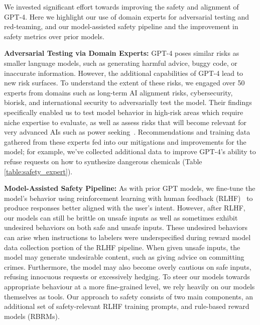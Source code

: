 We invested significant effort towards improving the safety and alignment of GPT-4. Here we highlight our use of domain experts for adversarial testing and red-teaming, and our model-assisted safety pipeline \citep{openaialignmentblog} and the improvement in safety metrics over prior models. 

\textbf{Adversarial Testing via Domain Experts:} GPT-4 poses similar risks as smaller language models, such as generating harmful advice, buggy code, or inaccurate information. However, the additional capabilities of GPT-4 lead to new risk surfaces. To understand the extent of these risks, we engaged over 50 experts from domains such as long-term AI alignment risks, cybersecurity, biorisk, and international security to adversarially test the model. Their findings specifically enabled us to test model behavior in high-risk areas which require niche expertise to evaluate, as well as assess risks that will become relevant for very advanced AIs such as power seeking~\citep{Carlsmith2022IsPA}. Recommendations and training data gathered from these experts fed into our mitigations and improvements for the model; for example, we've collected additional data to improve GPT-4's ability to refuse requests on how to synthesize dangerous chemicals (Table \ref{table:safety_expert}).

\textbf{Model-Assisted Safety Pipeline:} As with prior GPT models, we fine-tune the model's behavior using reinforcement learning with human feedback (RLHF)~\citep{christiano2017deep, ouyang2022training} to produce responses better aligned with the user's intent. However, after RLHF, our models can still be brittle on unsafe inputs as well as sometimes exhibit undesired behaviors on both safe and unsafe inputs. These undesired behaviors can arise when instructions to labelers were underspecified during reward model data collection portion of the RLHF pipeline. When given unsafe inputs, the model may generate undesirable content, such as giving advice on committing crimes. Furthermore, the model may also become overly cautious on safe inputs, refusing innocuous requests or excessively hedging. To steer our models towards appropriate behaviour at a more fine-grained level, we rely heavily on our models themselves as tools. Our approach to safety consists of two main components, an additional set of safety-relevant RLHF training prompts, and rule-based reward models (RBRMs).

